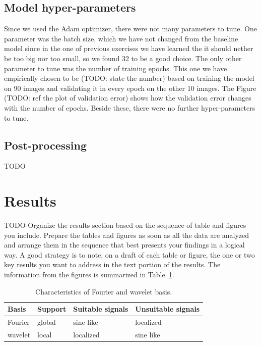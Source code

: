 \documentclass[10pt,conference,compsocconf]{IEEEtran}
\begin{document}
\subsection{Model hyper-parameters}
Since we used the Adam optimizer, there were not many parameters to tune. One parameter was the batch size, which we 
have not changed from the baseline model since in the one of previous exercises we have learned the it should nether be too
big nor too small, so we found 32 to be a good choice. The only other parameter to tune was the number of training epochs.
This one we have empirically chosen to be (TODO: state the number) based on training the model on 90 images and 
validating it in every epoch on the other 10 images. The Figure (TODO: ref the plot of validation error) shows
how the validation error changes with the number of epochs. Beside these, there were no further hyper-parameters to tune.


\subsection{Post-processing}
TODO


\section{Results}
\label{sec:results}

TODO
Organize the results section based on the sequence of table and
figures you include. Prepare the tables and figures as soon as all
the data are analyzed and arrange them in the sequence that best
presents your findings in a logical way. A good strategy is to note,
on a draft of each table or figure, the one or two key results you
want to address in the text portion of the results.
The information from the figures is
summarized in Table~\ref{tab:fourier-wavelet}.

\begin{table}[htbp]
  \centering
  \begin{tabular}[c]{|l||l|l|l|}
    \hline
    Basis&Support&Suitable signals&Unsuitable signals\\
    \hline
    Fourier&global&sine like&localized\\
    wavelet&local&localized&sine like\\
    \hline
  \end{tabular}
  \caption{Characteristics of Fourier and wavelet basis.}
  \label{tab:fourier-wavelet}
\end{table}
\end{document}
